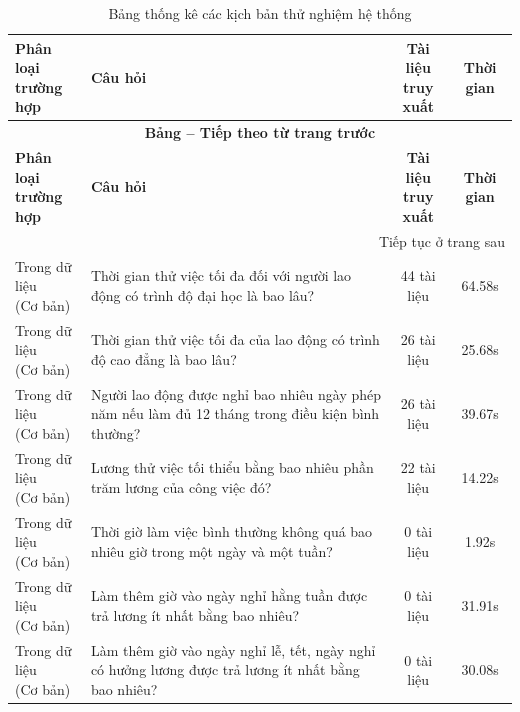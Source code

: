 \begin{longtable}{|l|p{6.5cm}|c|c|}
\caption{Bảng thống kê các kịch bản thử nghiệm hệ thống} \label{tab:thong_ke_chi_tiet} \\
\hline
\makecell[l]{\textbf{Phân loại}\\\textbf{trường hợp}} & \textbf{Câu hỏi} & \makecell{\textbf{Tài liệu}\\\textbf{truy xuất}} & \textbf{Thời gian} \\ \hline
\endfirsthead
\multicolumn{4}{c}{{\bfseries Bảng \thetable{} -- Tiếp theo từ trang trước}} \\
\hline
\makecell[l]{\textbf{Phân loại}\\\textbf{trường hợp}} & \textbf{Câu hỏi} & \makecell{\textbf{Tài liệu}\\\textbf{truy xuất}} & \textbf{Thời gian} \\ \hline
\endhead
\hline
\multicolumn{4}{r}{{Tiếp tục ở trang sau}} \\
\endfoot
\hline
\endlastfoot
\makecell[l]{Trong dữ liệu\\(Cơ bản)} & Thời gian thử việc tối đa đối với người lao động có trình độ đại học là bao lâu? & 44 tài liệu & 64.58s \\ \hline
\makecell[l]{Trong dữ liệu\\(Cơ bản)} & Thời gian thử việc tối đa của lao động có trình độ cao đẳng là bao lâu? & 26 tài liệu & 25.68s \\ \hline
\makecell[l]{Trong dữ liệu\\(Cơ bản)} & Người lao động được nghỉ bao nhiêu ngày phép năm nếu làm đủ 12 tháng trong điều kiện bình thường? & 26 tài liệu & 39.67s \\ \hline
\makecell[l]{Trong dữ liệu\\(Cơ bản)} & Lương thử việc tối thiểu bằng bao nhiêu phần trăm lương của công việc đó? & 22 tài liệu & 14.22s \\ \hline
\makecell[l]{Trong dữ liệu\\(Cơ bản)} & Thời giờ làm việc bình thường không quá bao nhiêu giờ trong một ngày và một tuần? & 0 tài liệu & 1.92s \\ \hline
\makecell[l]{Trong dữ liệu\\(Cơ bản)} & Làm thêm giờ vào ngày nghỉ hằng tuần được trả lương ít nhất bằng bao nhiêu? & 0 tài liệu & 31.91s \\ \hline
\makecell[l]{Trong dữ liệu\\(Cơ bản)} & Làm thêm giờ vào ngày nghỉ lễ, tết, ngày nghỉ có hưởng lương được trả lương ít nhất bằng bao nhiêu? & 0 tài liệu & 30.08s \\ \hline

\end{longtable}
